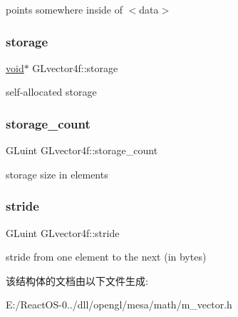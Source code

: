 points somewhere inside of $<$data$>$ \mbox{\label{struct_g_lvector4f_ad9723e4382903415fcc9dea824da1c2c}} 
\subsubsection{\texorpdfstring{storage}{storage}}
{\footnotesize\ttfamily \hyperlink{interfacevoid}{void}$\ast$ G\+Lvector4f\+::storage}

self-\/allocated storage \mbox{\label{struct_g_lvector4f_a16eec0e05b68c2dc7983b0208dd39a52}} 
\subsubsection{\texorpdfstring{storage\+\_\+count}{storage\_count}}
{\footnotesize\ttfamily G\+Luint G\+Lvector4f\+::storage\+\_\+count}

storage size in elements \mbox{\label{struct_g_lvector4f_a33ad01f392807d777a925f726cacb97b}} 
\subsubsection{\texorpdfstring{stride}{stride}}
{\footnotesize\ttfamily G\+Luint G\+Lvector4f\+::stride}

stride from one element to the next (in bytes) 

该结构体的文档由以下文件生成\+:\begin{DoxyCompactItemize}
\item 
E\+:/\+React\+O\+S-\/0../dll/opengl/mesa/math/m\+\_\+vector.\+h\end{DoxyCompactItemize}
